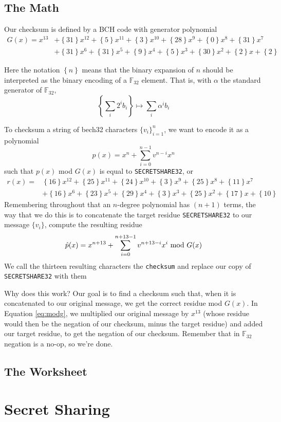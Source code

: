 \documentclass[letterpaper]{article}
\theoremstyle{xxx}
\theoremstyle{evil}
\theoremstyle{yyy}
\theoremstyle{plain}
\theoremstyle{zzz}
\newcommand{\fttwo}{\mathbb{F}_{32}}
\newcommand{\binrep}[1]{\left\{#1\right\}}
\begin{document}
\subsection{The Math}
Our checksum is defined by a BCH code with generator polynomial
\begin{align*}
    G(x) = x^{13}
        &+ \binrep{31}x^{12} + \binrep{5}x^{11} + \binrep{3}x^{10} + \binrep{28}x^9 + \binrep{0}x^8 + \binrep{31}x^7\\
        &+ \binrep{31}x^6 + \binrep{31}x^5 + \binrep{9}x^4 + \binrep{5}x^3 + \binrep{30}x^2 + \binrep{2}x + \binrep{2}
\end{align*}

Here the notation $\binrep{n}$ means that the binary expansion of $n$ should be
interpreted as the binary encoding of a $\fttwo$ element. That is, with $\alpha$
the standard generator of $\fttwo$,
\[ \binrep{\sum_i 2^ib_i} \mapsto \sum_i \alpha^ib_i \]

To checksum a string of bech32 characters $\{v_i\}_{i=1}^n$, we want to encode it
as a polynomial
\[ p(x) = x^n + \sum_{i=0}^{n-1} v^{n-i} x^n \]
such that $p(x)$ mod $G(x)$ is equal to \texttt{SECRETSHARE32}, or
\begin{align*}
r(x) =
    &\binrep{16}x^{12} + \binrep{25}x^{11} + \binrep{24}x^{10} + \binrep{3}x^9 + \binrep{25}x^8 + \binrep{11}x^7\\
    &+ \binrep{16}x^6 + \binrep{23}x^5 + \binrep{29}x^4 + \binrep{3}x^3 + \binrep{25}x^2 + \binrep{17}x + \binrep{10}
\end{align*}
Remembering throughout that an $n$-degree polynomial has $(n+1)$ terms, the way that
we do this is to concatenate the target residue \texttt{SECRETSHARE32} to our message
$\{ v_i \}$, compute the resulting residue
\begin{equation}
 \hat{p}(x) = x^{n+13} + \sum_{i=0}^{n+13-1} v^{n+13-i} x^{i} \textnormal{ mod } G(x)
 \label{eq:modg}
\end{equation}
We call the thirteen resulting characters the \texttt{checksum} and replace our
copy of \texttt{SECRETSHARE32} with them

Why does this work? Our goal is to find a checksum such that, when it is concatenated
to our original message, we get the correct residue mod $G(x)$. In Equation \eqref{eq:modg},
we multiplied our original message by $x^{13}$ (whose residue would then be the negation
of our checksum, minus the target residue) and added our target residue, to get the
negation of our checksum. Remember that in $\fttwo$ negation is a no-op, so we're done.

\subsection{The Worksheet}

\section{Secret Sharing}
\end{document}
